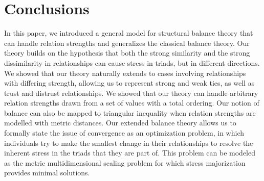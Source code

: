 \documentclass[acmtweb]{acmsmall}
\begin{document}
\begin{figure}[thbp!]
\end{figure}


\section{Conclusions} \label{sec:conclusions}
In this paper, we introduced a general model for structural balance
theory that can handle relation strengths and generalizes the
classical balance theory. Our theory builds on the hypothesis that
both the strong similarity and the strong dissimilarity in
relationships can cause stress in triads, but in different
directions. We showed that our theory naturally extends to cases
involving relationships with differing strength, allowing us to
represent strong and weak ties, as well as trust and distrust
relationships.  We showed that our theory can handle arbitrary
relation strengths drawn from a set of values with a total ordering.
Our notion of balance can also be mapped to triangular inequality when
relation strengths are modelled with metric distances.  Our extended
balance theory allows us to formally state the issue of convergence as
an optimization problem, in which individuals try to make the smallest
change in their relationships to resolve the inherent stress in the
triads that they are part of. This problem can be modeled as the
metric multidimensional scaling problem for which stress majorization
provides minimal solutions.
\end{document}
